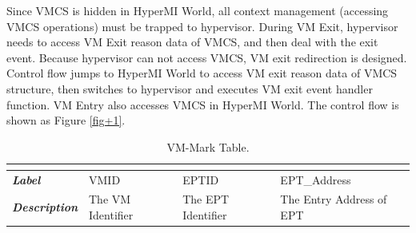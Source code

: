\documentclass[conference]{IEEEtran}
\begin{document}

Since VMCS is hidden in HyperMI World, all context management (accessing VMCS operations) must be trapped to hypervisor. During VM Exit, hypervisor needs to access  VM Exit reason data of VMCS, and then deal with the exit event.
 Because hypervisor can not access VMCS, VM exit redirection is designed. Control flow jumps to HyperMI World to access VM exit reason data of VMCS structure, then switches to hypervisor and executes VM exit event handler function. VM Entry also accesses VMCS in HyperMI World. The control flow is shown as Figure \ref{fig+1}.


\begin{table}[htbp]
\centering
\caption{VM-Mark Table.}\label{tab1}
\begin{tabular}{p{1.4cm}|p{1.2cm}|p{1.1cm}|p{1.7cm}}
\hline
\multicolumn{4}{c}{\bfseries\textbf\centering{VM-Mark Table}}\\
\hline
{\itshape\bfseries Label} & VMID & EPTID & EPT\_Address\\
\hline
{\itshape\bfseries Description} & { The VM Identifier} & The EPT Identifier & The Entry Address of EPT\\
\hline
\end{tabular}
\end{table}
\end{document}

